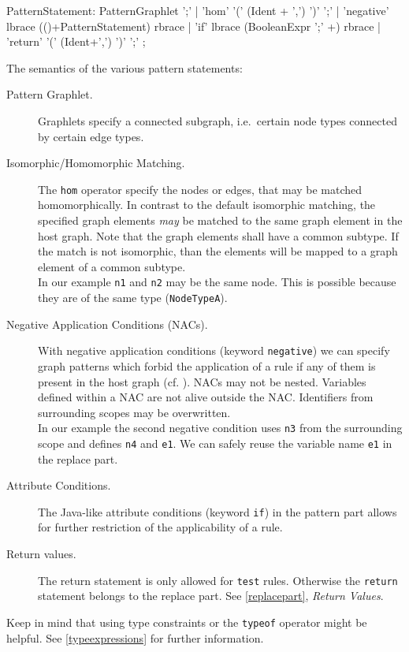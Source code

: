 \begin{rail}  
  PatternStatement: 
    PatternGraphlet ';' |
    'hom' '(' (Ident + ',') ')' ';' |
    'negative' lbrace (()+PatternStatement) rbrace |
    'if' lbrace (BooleanExpr ';' +) rbrace |
    'return' '(' (Ident+',') ')' ';' ;
\end{rail}
The semantics of the various pattern statements:
\begin{description}
  \item[Pattern Graphlet.] Graphlets specify a connected subgraph, i.e.\ certain node types connected by certain edge types.
  \item[Isomorphic/Homomorphic Matching.] The \texttt{hom} operator specify the nodes or edges, that may be matched homomorphically. In contrast to the default isomorphic matching, the specified graph elements \emph{may} be matched to the same graph element in the host graph. Note that the graph elements shall have a common subtype. If the match is not isomorphic, than the elements will be mapped to a graph element of a common subtype.\\
  In our example \texttt{n1} and \texttt{n2} may be the same node. This is possible because they are of the  same type (\texttt{NodeTypeA}).
  \item[Negative Application Conditions (NACs).] With negative application conditions (keyword \texttt{negative}) we can specify graph patterns which forbid the application of a rule if any of them is present in the host graph (cf. \cite{adam}). NACs may not be nested. Variables defined within a NAC are not alive outside the NAC. Identifiers from surrounding scopes may be overwritten.\\
  In our example the second negative condition uses \texttt{n3} from the surrounding scope and defines \texttt{n4} and \texttt{e1}. We can safely reuse the variable name \texttt{e1} in the replace part.
  \item[Attribute Conditions.] The Java-like attribute conditions (keyword \texttt{if}) in the pattern part allows for further restriction of the applicability of a rule.
  \item[Return values.] The return statement is only allowed for \texttt{test} rules. Otherwise the \texttt{return} statement belongs to the replace part. See \ref{replacepart}, \emph{Return Values}.
\end{description}
Keep in mind that using type constraints or the \texttt{typeof} operator might be helpful. See \ref{typeexpressions} for further information.

